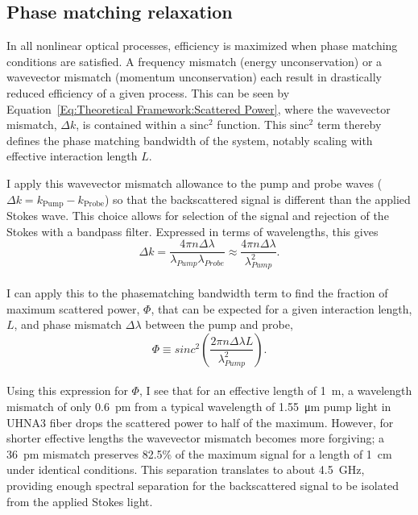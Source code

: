 \subsection{Phase matching relaxation}
\label{Theoretical Framework: Phase matching relaxation}
In all nonlinear optical processes, efficiency is maximized when phase matching conditions are satisfied. A frequency mismatch (energy unconservation) or a wavevector mismatch (momentum unconservation) each result in drastically reduced efficiency of a given process.\cite{maker1962effects} This can be seen by Equation~\ref{Eq:Theoretical Framework:Scattered Power}, where the wavevector mismatch, \(\Delta k\), is contained within a \(\mathrm{sinc^2}\) function. This \(\mathrm{sinc^2}\) term thereby defines the phase matching bandwidth of the system, notably scaling with effective interaction length \(L\).

I apply this wavevector mismatch allowance to the pump and probe waves (\(\Delta k = k_{\mathrm{Pump}} - k_{\mathrm{Probe}}\)) so that the backscattered signal is different than the applied Stokes wave. This choice allows for selection of the signal and rejection of the Stokes with a bandpass filter. Expressed in terms of wavelengths, this gives
\\
\begin{equation}
  \Delta k = \frac{4\pi n\Delta\lambda}{\lambda_{Pump}\lambda_{Probe}} \approx \frac{4\pi n\Delta\lambda}{\lambda_{Pump}^{2}}.
\end{equation}
\\
I can apply this to the phasematching bandwidth term to find the fraction of maximum scattered power, \(\Phi\), that can be expected for a given interaction length, \(L\), and phase mismatch \(\Delta\lambda\) between the pump and probe,
\\
\begin{equation}
  \Phi \equiv sinc^{2}\left(\frac{2\pi n\Delta\lambda L}{\lambda_{Pump}^{2}}\right).
  \label{Eq:Phi}
\end{equation}
\\
Using this expression for \(\Phi\), I see that for an effective length of \SI{1}{\meter}, a wavelength mismatch of only \SI{0.6}{\pico\meter} from a typical wavelength of \SI{1.55}{\micro\meter} pump light in UHNA3 fiber drops the scattered power to half of the maximum. However, for shorter effective lengths the wavevector mismatch becomes more forgiving; a \SI{36}{\pico\meter} mismatch preserves 82.5\% of the maximum signal for a length of \SI{1}{\centi\meter} under identical conditions. This separation translates to about \SI{4.5}{\giga\hertz}, providing enough spectral separation for the backscattered signal to be isolated from the applied Stokes light.

